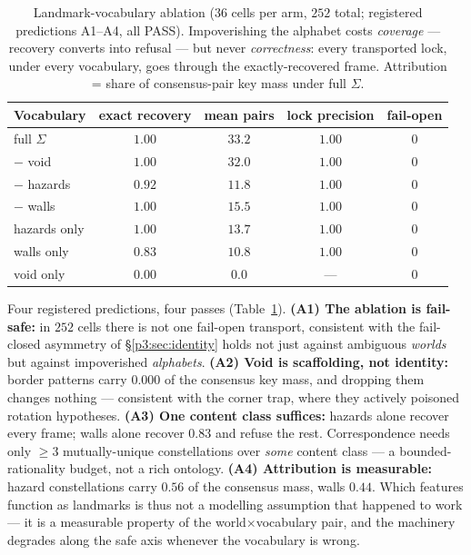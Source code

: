 \documentclass{article}
\begin{document}
\begin{table}[h]
\centering
\caption{Landmark-vocabulary ablation ($36$ cells per arm, $252$
total; registered predictions A1--A4, all PASS). Impoverishing the
alphabet costs \emph{coverage} --- recovery converts into refusal ---
but never \emph{correctness}: every transported lock, under every
vocabulary, goes through the exactly-recovered frame. Attribution =
share of consensus-pair key mass under full $\Sigma$.}
\label{p3:tab:ablation}
\small
\begin{tabular}{lcccc}
\toprule
Vocabulary & exact recovery & mean pairs & lock precision & fail-open \\
\midrule
full $\Sigma$ & $1.00$ & $33.2$ & $1.00$ & $0$ \\
$-$ void & $1.00$ & $32.0$ & $1.00$ & $0$ \\
$-$ hazards & $0.92$ & $11.8$ & $1.00$ & $0$ \\
$-$ walls & $1.00$ & $15.5$ & $1.00$ & $0$ \\
hazards only & $1.00$ & $13.7$ & $1.00$ & $0$ \\
walls only & $0.83$ & $10.8$ & $1.00$ & $0$ \\
void only & $0.00$ & $0.0$ & --- & $0$ \\
\bottomrule
\end{tabular}
\end{table}

Four registered predictions, four passes (Table~\ref{p3:tab:ablation}).
\textbf{(A1) The ablation is fail-safe:} in $252$ cells there is not
one fail-open transport, consistent with the fail-closed asymmetry of
\S\ref{p3:sec:identity} holds not just against ambiguous \emph{worlds}
but against impoverished \emph{alphabets}. \textbf{(A2) Void is
scaffolding, not identity:} border patterns carry $0.000$ of the
consensus key mass, and dropping them changes nothing --- consistent
with the corner trap, where they actively poisoned rotation
hypotheses. \textbf{(A3) One content class suffices:} hazards alone
recover every frame; walls alone recover $0.83$ and refuse the rest.
Correspondence needs only $\ge 3$ mutually-unique constellations over
\emph{some} content class --- a bounded-rationality budget, not a rich
ontology. \textbf{(A4) Attribution is measurable:} hazard
constellations carry $0.56$ of the consensus mass, walls $0.44$.
Which features function as landmarks is thus not a modelling
assumption that happened to work --- it is a measurable property of
the world$\times$vocabulary pair, and the machinery degrades along
the safe axis whenever the vocabulary is wrong.
\end{document}
